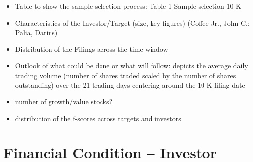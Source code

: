 \documentclass[12pt]{article}
\begin{document}
    \begin{itemize}

        \item Table to show the sample-selection process: Table 1 Sample selection 10-K \citep{You2009}

        \item Characteristics of the Investor/Target (size, key figures) (Coffee Jr., John C.; Palia, Darius)

        \item Distribution of the Filings across the time window

        \item Outlook of what could be done or what will follow: depicts the average daily trading volume (number of shares traded scaled by the number of shares outstanding) over the 21 trading days centering around the 10-K filing date \citep{You2009}

        \item number of growth/value stocks? 

        \item distribution of the f-scores across targets and investors

    \end{itemize}

\section{Financial Condition -- Investor}
\end{document}
